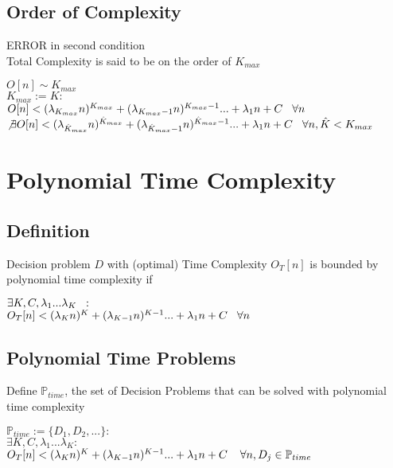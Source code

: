 \documentclass[11pt]{article}
\begin{document}
\subsection{Order of Complexity}
ERROR in second condition\\
Total Complexity is said to be on the order of $K_{max}$
\begin{center}
$
O[n] \sim K_{max}
$
\\ \vspace{2mm}
$
K_{max} := K :
$
\\ \vspace{2mm}
$
O[n] < (\lambda_{K_{max}} n)^{K_{max}} + (\lambda_{K_{max}-1} n)^{K_{max}-1}... + \lambda_1 n + C \hspace{3mm} \forall n
$
\\ \vspace{2mm}
$
\not \exists O[n] < (\lambda_{\hat{K}_{max}} n)^{\hat{K}_{max}} + (\lambda_{\hat{K}_{max}-1} n)^{\hat{K}_{max}-1}... + \lambda_1 n + C \hspace{3mm} \forall n,\hat{K} < K_{max}
$
\end{center}




\newpage
\section{Polynomial Time Complexity}

\subsection{Definition}
Decision problem $D$ with (optimal) Time Complexity $O_T[n]$ is bounded by polynomial time complexity if
\begin{center}
$\exists K,C,\lambda_1...\lambda_K \hspace{2mm} :$
\\ \vspace{2mm}
$O_T[n] < (\lambda_K n)^K + (\lambda_{K-1} n)^{K-1}... + \lambda_1 n + C \hspace{3mm} \forall n$
\end{center}








\subsection{Polynomial Time Problems}
Define $\mathbb{P}_{time}$, the set of Decision Problems that can be solved with polynomial time complexity
\begin{center}
$
\mathbb{P}_{time} := \{D_1,D_2,...\} : 
$
\\
$
\exists K,C,\lambda_1...\lambda_K : 
$
\\
$
O_T[n] < (\lambda_K n)^K + (\lambda_{K-1} n)^{K-1}... + \lambda_1 n + C \hspace{4mm} \forall n, D_j \in \mathbb{P}_{time}
$
\end{center}
\end{document}
